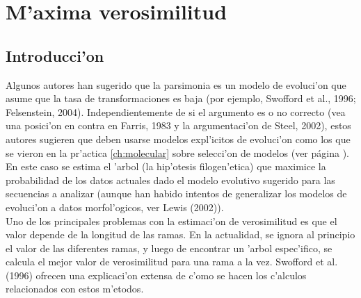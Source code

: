 \chapter{M'axima verosimilitud}
\section*{Introducci'on}
\label{ch:likelihood}
Algunos autores han sugerido que la parsimonia es un modelo de evoluci'on que asume que la tasa de transformaciones es baja (por ejemplo, Swofford et al., 1996; Felsenstein, 2004). Independientemente de si el argumento es o no correcto (vea una posici'on en contra en Farris, 1983 y la argumentaci'on de Steel, 2002), estos autores sugieren que deben usarse modelos expl'icitos de evoluci'on como los que se vieron en la pr'actica \ref{ch:molecular} sobre selecci'on de modelos (ver p\'agina \pageref{ch:molecular}).\\
En este caso se estima el 'arbol (la hip'otesis filogen'etica) que 
maximice la probabilidad de los datos actuales dado el modelo evolutivo 
sugerido para las secuencias a analizar (aunque han habido intentos de 
generalizar los modelos de evoluci'on a datos morfol'ogicos, ver  
Lewis (2002)).\\
Uno de los principales problemas con la estimaci'on de verosimilitud es que el valor depende de la longitud de las ramas. En la actualidad, se ignora al principio el valor de las diferentes ramas, y luego de encontrar un 'arbol espec'ifico, se calcula el mejor valor de verosimilitud para una rama a la vez. Swofford et al. (1996) ofrecen una explicaci'on extensa de c'omo se hacen los c'alculos relacionados con estos m'etodos.
